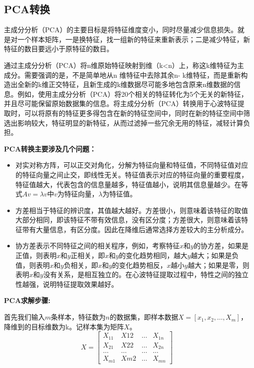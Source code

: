 \subsection{PCA转换}
{主成分分析（PCA）的主要目标是将特征维度变小，同时尽量减少信息损失。就是对一个样本矩阵，一是换特征，找一组新的特征来重新表示；二是减少特征，新特征的数目要远小于原特征的数目。}
\par
{通过主成分分析（PCA）将n维原始特征映射到维（k<n）上，称这k维特征为主成分。需要强调的是，不是简单地从n 维特征中去除其余n- k维特征，而是重新构造出全新的k维正交特征，且新生成的k维数据尽可能多地包含原来n维数据的信息。例如，使用主成分分析（PCA）将20个相关的特征转化为5个无关的新特征，并且尽可能保留原始数据集的信息。将主成分分析（PCA）转换用于心波特征提取时，可以将原有的特征更多得包含在新的特征空间中，同时在新的特征空间中筛选出影响较大，特征明显的新特征，从而过滤掉一些冗余无用的特征，减轻计算负担。}
\par
{\bf{PCA转换主要涉及几个问题}：}
\begin{itemize}
    \item {对实对称方阵，可以正交对角化，分解为特征向量和特征值，不同特征值对应的特征向量之间止交，即线性无关。特征值表示对应的特征向量的重要程度，特征值越大，代表包含的信息量越多，特征值越小，说明其信息量越少。在等式$Av=\lambda v$中$v$为特征向量，$\lambda$为特征值。}
    \item {方差相当于特征的辨识度，其值越大越好。方差很小，则意味着该特征的取值大部分相同，即该特征不带有效信息，没有区分度；方差很大，则意味着该特征带有大量信息，有区分度。因此在降维后通常选择方差较大的主分析成分。}
    \item {协方差表示不同特征之间的相关程序，例如，考察特征$x$和$y$的协方差，如果是正值，则表明$x$和$y$正相关，即$x$和$y$的变化趋势相同，越大$y$越大；如果是负值，则表明$x$和$y$负相关，即$x$和$y$的变化趋势相反，$x$越小$y$越大；如果是零，则表明$x$和$y$没有关系，是相互独立的。在心波特征提取过程中，特性之间的独立性越强，说明特征提取效果越好。}
\end{itemize}
\par
{\bf{PCA求解步骤}:}
\par
{首先我们输入$m$条样本，特征数为$n$的数据集，即样本数据$X=[x_1,x_2,\dots ,X_m]$，降维到的目标维数为k。记样本集为矩阵$X$。}
\begin{equation}
    X=\begin{bmatrix}
        X_{11} & X{12} & \dots & X_{1n} \\
        X_{21} & X{22} & \dots & X_{2n} \\
        \dots  & \dots  & \dots & \dots  \\
        X_{m1} & X{m2} & \dots & X_{mn} 
    \end{bmatrix}
\end{equation}

